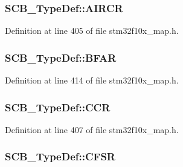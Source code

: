 \subsubsection[{\texorpdfstring{A\+I\+R\+CR}{AIRCR}}]{ S\+C\+B\+\_\+\+Type\+Def\+::\+A\+I\+R\+CR}\hypertarget{struct_s_c_b___type_def_a268a81d1a31a92ca3b49c89e715da4d0}{}\label{struct_s_c_b___type_def_a268a81d1a31a92ca3b49c89e715da4d0}


Definition at line 405 of file stm32f10x\+\_\+map.\+h.

\subsubsection[{\texorpdfstring{B\+F\+AR}{BFAR}}]{ S\+C\+B\+\_\+\+Type\+Def\+::\+B\+F\+AR}\hypertarget{struct_s_c_b___type_def_a17db96ee7ae775af8899594d19c822de}{}\label{struct_s_c_b___type_def_a17db96ee7ae775af8899594d19c822de}


Definition at line 414 of file stm32f10x\+\_\+map.\+h.

\subsubsection[{\texorpdfstring{C\+CR}{CCR}}]{ S\+C\+B\+\_\+\+Type\+Def\+::\+C\+CR}\hypertarget{struct_s_c_b___type_def_a2060dc4dff7eafec405ff4a3ebdbc6ba}{}\label{struct_s_c_b___type_def_a2060dc4dff7eafec405ff4a3ebdbc6ba}


Definition at line 407 of file stm32f10x\+\_\+map.\+h.

\subsubsection[{\texorpdfstring{C\+F\+SR}{CFSR}}]{ S\+C\+B\+\_\+\+Type\+Def\+::\+C\+F\+SR}\hypertarget{struct_s_c_b___type_def_a6f9fa0acc8876b471a08711905fbe404}{}\label{struct_s_c_b___type_def_a6f9fa0acc8876b471a08711905fbe404}


